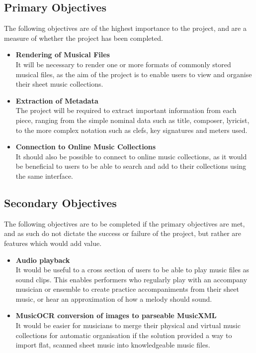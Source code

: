 \subsection{Primary Objectives}
The following objectives are of the highest importance to the project, and are a measure of whether the project has been completed.
\begin{itemize}
    \item \textbf{Rendering of Musical Files}\\
    It will be necessary to render one or more formats of commonly stored musical files, as the aim of the project is to enable users to view and organise their sheet music collections.
    \item \textbf{Extraction of Metadata}\\
    The project will be required to extract important information from each piece, ranging from the simple nominal data such as title, composer, lyricist, to the more complex notation such as clefs, key signatures and meters used. 
    \item \textbf{Connection to Online Music Collections}\\
    It should also be possible to connect to online music collections, as it would be beneficial to users to be able to search and add to their collections using the same interface.

\end{itemize}
\subsection{Secondary Objectives}
The following objectives are to be completed if the primary objectives are met, and as such do not dictate the success or failure of the project, but rather are features which would add value.

\begin{itemize}
    \item \textbf{Audio playback}\\
    It would be useful to a cross section of users to be able to play music files as sound clips. This enables performers who regularly play with an accompany musician or ensemble to create practice accompaniments from their sheet music, or hear an approximation of how a melody should sound.
    \item \textbf{MusicOCR conversion of images to parseable MusicXML}\\
It would be easier for musicians to merge their physical and virtual music collections for automatic organisation if the solution provided a way to import flat, scanned sheet music into knowledgeable music files. 
\end{itemize}
